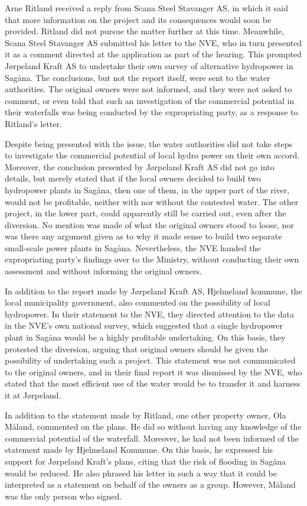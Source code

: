 Arne Ritland received a reply from Scana Steel Stavanger AS, in which it said that more information on the project and its consequences would soon be provided. Ritland did not pursue the matter further at this time. Meanwhile, Scana Steel Stavanger AS submitted his letter to the NVE, who in turn presented it as a comment directed at the application as part of the hearing. This prompted Jørpeland Kraft AS to undertake their own survey of alternative hydropower in Sagåna. The conclusions, but not the report itself, were sent to the water authorities. The original owners were not informed, and they were not asked to comment, or even told that such an investigation of the commercial potential in their waterfalls was being conducted by the expropriating party, as a response to Ritland's letter.

Despite being presented with the issue, the water authorities did not take steps to investigate the commercial potential of local hydro power on their own accord. Moreover, the conclusion presented by Jørpeland Kraft AS did not go into details, but merely stated that if the local owners decided to build two hydropower plants in Sagåna, then one of them, in the upper part of the river, would not be profitable, neither with nor without the contested water. The other project, in the lower part, could apparently still be carried out, even after the diversion. No mention was made of what the original owners stood to loose, nor was there any argument given as to why it made sense to build two separate small-scale power plants in Sagåna. Nevertheless, the NVE handed the expropriating party's findings over to the Ministry, without conducting their own assessment and without informing the original owners. 

In addition to the report made by Jørpeland Kraft AS, Hjelmeland kommune, the local municipality government, also commented on the possibility of local hydropower. In their statement to the NVE, they directed attention to the data in the NVE's own national survey, which suggested that a single hydropower plant in Sagåna would be a highly profitable undertaking. On this basis, they protested the diversion, arguing that original owners should be given the possibility of undertaking such a project. This statement was not communicated to the original owners, and in their final report it was dismissed by the NVE, who stated that the most efficient use of the water would be to transfer it and harness it at Jørpeland.

In addition to the statement made by Ritland, one other property owner, Ola Måland, commented on the plans. He did so without having any knowledge of the commercial potential of the waterfall. Moreover, he had not been informed of the statement made by Hjelmeland Kommune. On this basis, he expressed his support for Jørpeland Kraft's plans, citing that the risk of flooding in Sagåna would be reduced. He also phrased his letter in such a way that it could be interpreted as a statement on behalf of the owners as a group. However, Måland was the only person who signed.

